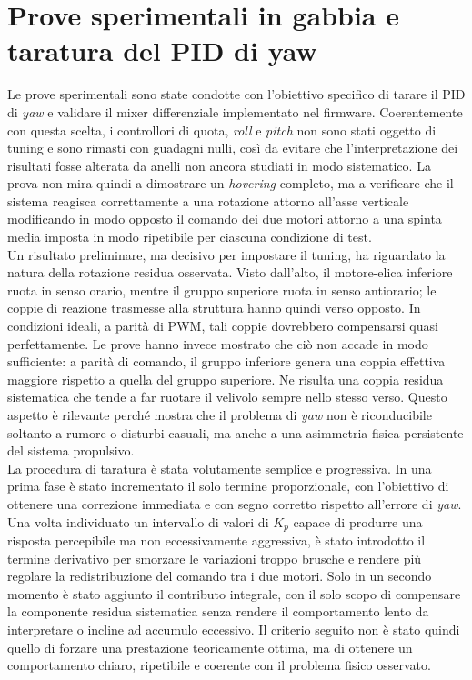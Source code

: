 \documentclass[11pt]{report}
\begin{document}
	\section{Prove sperimentali in gabbia e taratura del PID di yaw}
	Le prove sperimentali sono state condotte con l'obiettivo specifico di tarare il PID di \textit{yaw} e validare il mixer differenziale implementato nel firmware. Coerentemente con questa scelta, i controllori di quota, \textit{roll} e \textit{pitch} non sono stati oggetto di tuning e sono rimasti con guadagni nulli, così da evitare che l'interpretazione dei risultati fosse alterata da anelli non ancora studiati in modo sistematico. La prova non mira quindi a dimostrare un \textit{hovering} completo, ma a verificare che il sistema reagisca correttamente a una rotazione attorno all'asse verticale modificando in modo opposto il comando dei due motori attorno a una spinta media imposta in modo ripetibile per ciascuna condizione di test.\\
	Un risultato preliminare, ma decisivo per impostare il tuning, ha riguardato la natura della rotazione residua osservata. Visto dall'alto, il motore-elica inferiore ruota in senso orario, mentre il gruppo superiore ruota in senso antiorario; le coppie di reazione trasmesse alla struttura hanno quindi verso opposto. In condizioni ideali, a parità di PWM, tali coppie dovrebbero compensarsi quasi perfettamente. Le prove hanno invece mostrato che ciò non accade in modo sufficiente: a parità di comando, il gruppo inferiore genera una coppia effettiva maggiore rispetto a quella del gruppo superiore. Ne risulta una coppia residua sistematica che tende a far ruotare il velivolo sempre nello stesso verso. Questo aspetto è rilevante perché mostra che il problema di \textit{yaw} non è riconducibile soltanto a rumore o disturbi casuali, ma anche a una asimmetria fisica persistente del sistema propulsivo.\\
	La procedura di taratura è stata volutamente semplice e progressiva. In una prima fase è stato incrementato il solo termine proporzionale, con l'obiettivo di ottenere una correzione immediata e con segno corretto rispetto all'errore di \textit{yaw}. Una volta individuato un intervallo di valori di \(K_p\) capace di produrre una risposta percepibile ma non eccessivamente aggressiva, è stato introdotto il termine derivativo per smorzare le variazioni troppo brusche e rendere più regolare la redistribuzione del comando tra i due motori. Solo in un secondo momento è stato aggiunto il contributo integrale, con il solo scopo di compensare la componente residua sistematica senza rendere il comportamento lento da interpretare o incline ad accumulo eccessivo. Il criterio seguito non è stato quindi quello di forzare una prestazione teoricamente ottima, ma di ottenere un comportamento chiaro, ripetibile e coerente con il problema fisico osservato.\\
\end{document}
